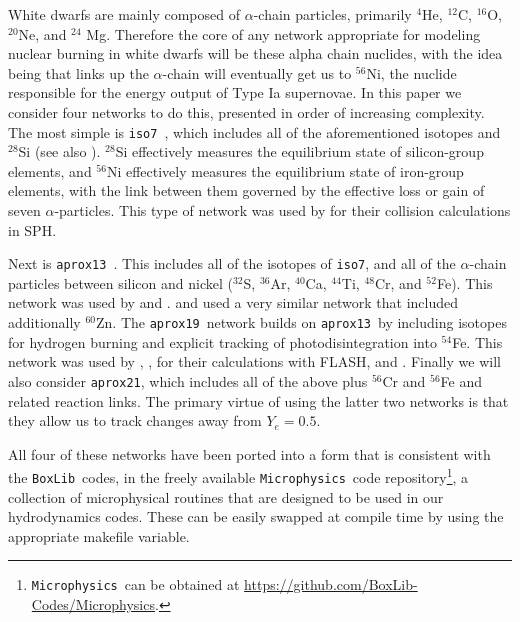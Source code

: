 \documentclass[twocolumn,numberedappendix]{../aastex6}
\newcommand{\boxlib}{\texttt{BoxLib}}
\newcommand{\microphysics}{\texttt{Microphysics}}
\newcommand{\isoseven}{\texttt{iso7}}
\newcommand{\aproxthirteen}{\texttt{aprox13}}
\newcommand{\aproxnineteen}{\texttt{aprox19}}
\newcommand{\aproxtwentyone}{\texttt{aprox21}}
\begin{document}
White dwarfs are mainly composed of $\alpha$-chain particles, primarily ${}^4$He,
${}^{12}$C, ${}^{16}$O, ${}^{20}$Ne, and ${}^{24}$ Mg. Therefore the core of
any network appropriate for modeling nuclear burning in white dwarfs will be
these alpha chain nuclides, with the idea being that links up the $\alpha$-chain
will eventually get us to ${}^{56}$Ni, the nuclide responsible for the
energy output of Type Ia supernovae. In this paper we consider four networks
to do this, presented in order of increasing complexity. The most simple is
\isoseven\ \citep{timmes:2000}, which includes all of the aforementioned isotopes and
${}^{28}$Si (see also \citet{hix:1998}). ${}^{28}$Si effectively measures the
equilibrium state of silicon-group elements, and ${}^{56}$Ni effectively measures
the equilibrium state of iron-group elements, with the link between them governed
by the effective loss or gain of seven $\alpha$-particles. This type of network
was used by \citet{rosswog:2009} for their collision calculations in SPH.

Next is \aproxthirteen\ \citep{timmes:1999,timmes:2000}. This includes
all of the isotopes of \isoseven, and all of the $\alpha$-chain particles between
silicon and nickel (${}^{32}$S, ${}^{36}$Ar, ${}^{40}$Ca, ${}^{44}$Ti, ${}^{48}$Cr,
and ${}^{52}$Fe). This network was used by \citet{hawley:2012} and \citet{raskin:2010}.
\citet{loren-aguilar:2010} and \citet{garcia-senz:2013} used a very similar network
that included additionally ${}^{60}$Zn. The \aproxnineteen\ network \citep{timmes:1999}
builds on \aproxthirteen\ by including isotopes for hydrogen burning and explicit
tracking of photodisintegration into ${}^{54}$Fe. This network was used by
\citet{kushnir:2013}, \citet{kushnir:2014}, \citet{rosswog:2009} for their
calculations with FLASH, and \citet{papish:2015}. Finally we will also
consider \aproxtwentyone, which includes all of the above plus ${}^{56}$Cr
and ${}^{56}$Fe and related reaction links. The primary virtue of using
the latter two networks is that they allow us to track changes away from
$Y_e = 0.5$.

All four of these networks have been ported into a form that is consistent
with the \boxlib\ codes, in the freely available \microphysics\ code
repository\footnote{\microphysics\ can be obtained at \url{https://github.com/BoxLib-Codes/Microphysics}.},
a collection of microphysical routines that are designed to be used in our
hydrodynamics codes. These can be easily swapped at compile time by using the 
appropriate makefile variable.
\end{document}
